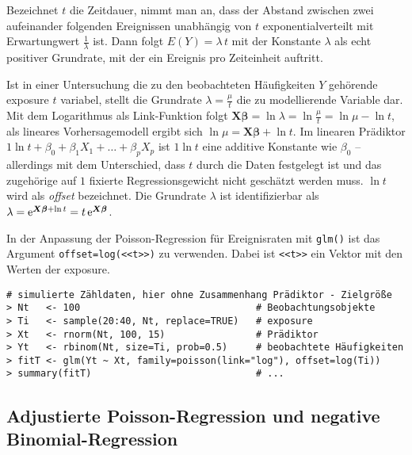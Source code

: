 Bezeichnet $t$ die Zeitdauer, nimmt man an, dass der Abstand zwischen zwei aufeinander folgenden Ereignissen unabhängig von $t$ exponentialverteilt mit Erwartungwert $\frac{1}{\lambda}$ ist. Dann folgt $E(Y) = \lambda \, t$ mit der Konstante $\lambda$ als echt positiver Grundrate, mit der ein Ereignis pro Zeiteinheit auftritt.

Ist in einer Untersuchung die zu den beobachteten Häufigkeiten $Y$ gehörende exposure $t$ variabel, stellt die Grundrate $\lambda = \frac{\mu}{t}$ die zu modellierende Variable dar. Mit dem Logarithmus als Link-Funktion folgt $\bm{X} \bm{\beta} = \ln \lambda = \ln \frac{\mu}{t} = \ln \mu - \ln t$, als lineares Vorhersagemodell ergibt sich $\ln \mu = \bm{X} \bm{\beta} + \ln t$. Im linearen Prädiktor $1 \ln t + \beta_{0} + \beta_{1} X_{1} + \dots + \beta_{p} X_{p}$ ist $1 \ln t$ eine additive Konstante wie $\beta_{0}$ -- allerdings mit dem Unterschied, dass $t$ durch die Daten festgelegt ist und das zugehörige auf $1$ fixierte Regressionsgewicht nicht geschätzt werden muss. $\ln t$ wird als \emph{offset} bezeichnet. Die Grundrate $\lambda$ ist identifizierbar als $\lambda = {\mathrm{e}}^{\bm{X} \bm{\beta} + \ln t} = t \, {\mathrm{e}}^{\bm{X} \bm{\beta}}$.

In der Anpassung der Poisson-Regression für Ereignisraten mit \lstinline!glm()! ist das Argument \lstinline!offset=log(<<t>>)! zu verwenden. Dabei ist \lstinline!<<t>>! ein Vektor mit den Werten der exposure.
\begin{lstlisting}
# simulierte Zähldaten, hier ohne Zusammenhang Prädiktor - Zielgröße
> Nt   <- 100                               # Beobachtungsobjekte
> Ti   <- sample(20:40, Nt, replace=TRUE)   # exposure
> Xt   <- rnorm(Nt, 100, 15)                # Prädiktor
> Yt   <- rbinom(Nt, size=Ti, prob=0.5)     # beobachtete Häufigkeiten
> fitT <- glm(Yt ~ Xt, family=poisson(link="log"), offset=log(Ti))
> summary(fitT)                             # ...
\end{lstlisting}

\subsection{Adjustierte Poisson-Regression und negative Binomial-Regression}

